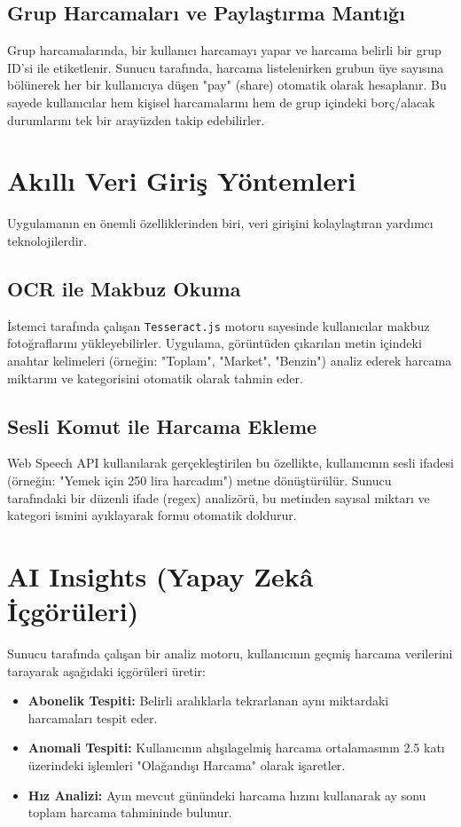\subsection{Grup Harcamaları ve Paylaştırma Mantığı}
Grup harcamalarında, bir kullanıcı harcamayı yapar ve harcama belirli bir grup ID'si ile etiketlenir. Sunucu tarafında, harcama listelenirken grubun üye sayısına bölünerek her bir kullanıcıya düşen "pay" (share) otomatik olarak hesaplanır. Bu sayede kullanıcılar hem kişisel harcamalarını hem de grup içindeki borç/alacak durumlarını tek bir arayüzden takip edebilirler.

\section{Akıllı Veri Giriş Yöntemleri}

Uygulamanın en önemli özelliklerinden biri, veri girişini kolaylaştıran yardımcı teknolojilerdir.

\subsection{OCR ile Makbuz Okuma}
İstemci tarafında çalışan \texttt{Tesseract.js} motoru sayesinde kullanıcılar makbuz fotoğraflarını yükleyebilirler. Uygulama, görüntüden çıkarılan metin içindeki anahtar kelimeleri (örneğin: "Toplam", "Market", "Benzin") analiz ederek harcama miktarını ve kategorisini otomatik olarak tahmin eder.

\subsection{Sesli Komut ile Harcama Ekleme}
Web Speech API kullanılarak gerçekleştirilen bu özellikte, kullanıcının sesli ifadesi (örneğin: "Yemek için 250 lira harcadım") metne dönüştürülür. Sunucu tarafındaki bir düzenli ifade (regex) analizörü, bu metinden sayısal miktarı ve kategori ismini ayıklayarak formu otomatik doldurur.

\section{AI Insights (Yapay Zekâ İçgörüleri)}

Sunucu tarafında çalışan bir analiz motoru, kullanıcının geçmiş harcama verilerini tarayarak aşağıdaki içgörüleri üretir:
\begin{itemize}
    \item \textbf{Abonelik Tespiti:} Belirli aralıklarla tekrarlanan aynı miktardaki harcamaları tespit eder.
    \item \textbf{Anomali Tespiti:} Kullanıcının alışılagelmiş harcama ortalamasının 2.5 katı üzerindeki işlemleri "Olağandışı Harcama" olarak işaretler.
    \item \textbf{Hız Analizi:} Ayın mevcut günündeki harcama hızını kullanarak ay sonu toplam harcama tahmininde bulunur.
\end{itemize}

